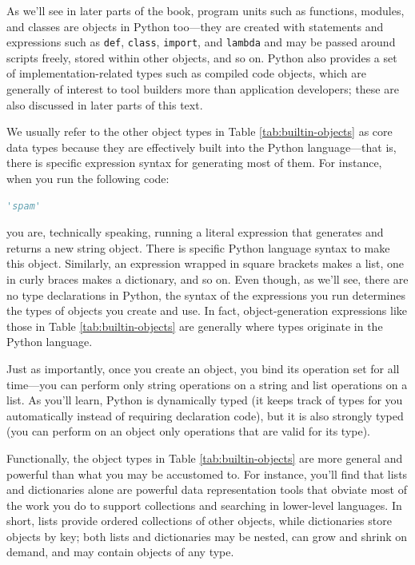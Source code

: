 \documentclass[12pt]{book}
\begin{document}
As we'll see in later parts of the book, program units such as functions, modules, and classes are objects in Python too—they are created with statements and expressions such as \texttt{def}, \texttt{class}, \texttt{import}, and \texttt{lambda} and may be passed around scripts freely, stored within other objects, and so on. Python also provides a set of implementation-related types such as compiled code objects, which are generally of interest to tool builders more than application developers; these are also discussed in later parts of this text.

We usually refer to the other object types in Table \ref{tab:builtin-objects} as core data types because they are effectively built into the Python language—that is, there is specific expression syntax for generating most of them. For instance, when you run the following code:

\begin{lstlisting}[language=Python]
    'spam'
\end{lstlisting}

you are, technically speaking, running a literal expression that generates and returns a new string object. There is specific Python language syntax to make this object. Similarly, an expression wrapped in square brackets makes a list, one in curly braces makes a dictionary, and so on. Even though, as we'll see, there are no type declarations in Python, the syntax of the expressions you run determines the types of objects you create and use. In fact, object-generation expressions like those in Table \ref{tab:builtin-objects} are generally where types originate in the Python language.

Just as importantly, once you create an object, you bind its operation set for all time—you can perform only string operations on a string and list operations on a list. As you'll learn, Python is dynamically typed (it keeps track of types for you automatically instead of requiring declaration code), but it is also strongly typed (you can perform on an object only operations that are valid for its type).

Functionally, the object types in Table \ref{tab:builtin-objects} are more general and powerful than what you may be accustomed to. For instance, you'll find that lists and dictionaries alone are powerful data representation tools that obviate most of the work you do to support collections and searching in lower-level languages. In short, lists provide ordered collections of other objects, while dictionaries store objects by key; both lists and dictionaries may be nested, can grow and shrink on demand, and may contain objects of any type.
\end{document}
